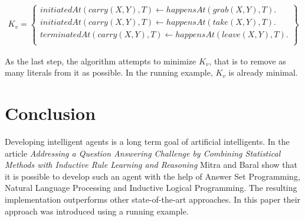 \documentclass[runningheads]{llncs}
\newcommand{\papertitle}{Addressing a Question Answering Challenge by Combining Statistical Methods with Inductive Rule Learning and Reasoning}
\newcommand{\authorquote}{Mitra and Baral}
\begin{document}
        \begin{align*}
        K_v = 
        \left\{ 
        \begin{matrix}{initiatedAt(carry(X, Y ), T) \leftarrow happensAt(grab(X, Y ), T).}\\
{initiatedAt(carry(X, Y ), T) \leftarrow happensAt(take(X, Y ), T).}\\
{terminatedAt(carry(X, Y ), T) \leftarrow happensAt(leave(X, Y ), T).}\\
        \end{matrix}\right\}
    \end{align*}
        

As the last step, the algorithm attempts to minimize $K_v$, that is to remove as many literals from it as possible. In the running example, $K_v$ is already minimal.



    
















\section{Conclusion} \label{sec:conclusion}

Developing intelligent agents is a long term goal of artificial intelligents. In the article \textit{\papertitle{}} \authorquote{} show that it is possible to develop such an agent with the help of Answer Set Programming, Natural Language Processing and Inductive Logical Programming. The resulting implementation outperforms other state-of-the-art approaches. In this paper their approach was introduced using a running example. 







\end{document}
